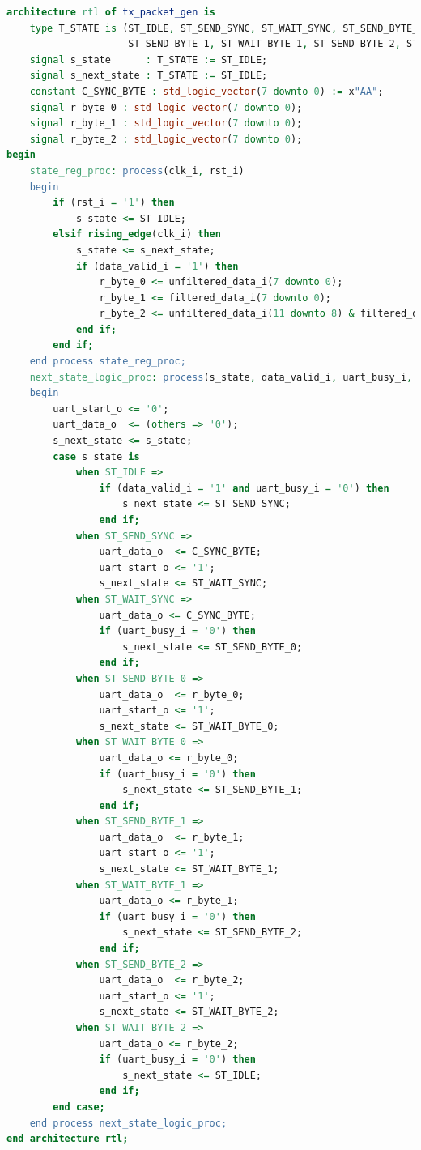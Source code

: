 \documentclass[a4paper,12pt]{article}
\begin{document}
\begin{lstlisting}[language=VHDL, basicstyle=\tiny, lineskip=0em,belowskip=0em,aboveskip=0em, frame=single]
architecture rtl of tx_packet_gen is
    type T_STATE is (ST_IDLE, ST_SEND_SYNC, ST_WAIT_SYNC, ST_SEND_BYTE_0, ST_WAIT_BYTE_0,
                     ST_SEND_BYTE_1, ST_WAIT_BYTE_1, ST_SEND_BYTE_2, ST_WAIT_BYTE_2);
    signal s_state      : T_STATE := ST_IDLE;
    signal s_next_state : T_STATE := ST_IDLE;
    constant C_SYNC_BYTE : std_logic_vector(7 downto 0) := x"AA";
    signal r_byte_0 : std_logic_vector(7 downto 0);
    signal r_byte_1 : std_logic_vector(7 downto 0);
    signal r_byte_2 : std_logic_vector(7 downto 0);
begin
    state_reg_proc: process(clk_i, rst_i)
    begin
        if (rst_i = '1') then
            s_state <= ST_IDLE;
        elsif rising_edge(clk_i) then
            s_state <= s_next_state;
            if (data_valid_i = '1') then
                r_byte_0 <= unfiltered_data_i(7 downto 0);
                r_byte_1 <= filtered_data_i(7 downto 0);
                r_byte_2 <= unfiltered_data_i(11 downto 8) & filtered_data_i(11 downto 8);
            end if;
        end if;
    end process state_reg_proc;
    next_state_logic_proc: process(s_state, data_valid_i, uart_busy_i, r_byte_0, r_byte_1, r_byte_2)
    begin
        uart_start_o <= '0';
        uart_data_o  <= (others => '0');
        s_next_state <= s_state;
        case s_state is
            when ST_IDLE =>
                if (data_valid_i = '1' and uart_busy_i = '0') then
                    s_next_state <= ST_SEND_SYNC;
                end if;
            when ST_SEND_SYNC =>
                uart_data_o  <= C_SYNC_BYTE;
                uart_start_o <= '1';
                s_next_state <= ST_WAIT_SYNC;
            when ST_WAIT_SYNC =>
                uart_data_o <= C_SYNC_BYTE;
                if (uart_busy_i = '0') then
                    s_next_state <= ST_SEND_BYTE_0;
                end if;
            when ST_SEND_BYTE_0 =>
                uart_data_o  <= r_byte_0;
                uart_start_o <= '1';
                s_next_state <= ST_WAIT_BYTE_0;
            when ST_WAIT_BYTE_0 =>
                uart_data_o <= r_byte_0;
                if (uart_busy_i = '0') then
                    s_next_state <= ST_SEND_BYTE_1;
                end if;
            when ST_SEND_BYTE_1 =>
                uart_data_o  <= r_byte_1;
                uart_start_o <= '1';
                s_next_state <= ST_WAIT_BYTE_1;
            when ST_WAIT_BYTE_1 =>
                uart_data_o <= r_byte_1;
                if (uart_busy_i = '0') then
                    s_next_state <= ST_SEND_BYTE_2;
                end if;
            when ST_SEND_BYTE_2 =>
                uart_data_o  <= r_byte_2;
                uart_start_o <= '1';
                s_next_state <= ST_WAIT_BYTE_2;
            when ST_WAIT_BYTE_2 =>
                uart_data_o <= r_byte_2;
                if (uart_busy_i = '0') then
                    s_next_state <= ST_IDLE;
                end if;
        end case;
    end process next_state_logic_proc;
end architecture rtl;
\end{lstlisting}
\end{document}
